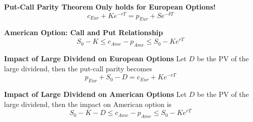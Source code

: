 \documentclass[11pt,fleqn]{book} %
\numberwithin{equation}{section} %
\numberwithin{figure}{section} %
\numberwithin{table}{section} %
\begin{document}
 \begin{theorem}\textbf{Put-Call Parity Theorem}
 \textbf{Only holds for European Options!}
 $$
 c_{Eur}+Ke^{-rT}=p_{Eur}+Se^{-\delta T}
 $$
 \end{theorem}
 \begin{theorem}\textbf{American Option: Call and Put Relationship}
 $$
 S_0-K\leq c_{Ame}-p_{Ame}\leq S_0-Ke^{rT}
 $$
 \end{theorem}
 \begin{theorem}\textbf{Impact of Large Dividend on European Options}
 Let $D$ be the PV of the large dividend, then the put-call parity becomes
 $$
 p_{Eur}+S_0-D=c_{Eur}+Ke^{-rT}
 $$
 \end{theorem}
 \begin{theorem}\textbf{Impact of Large Dividend on American Options}
 Let $D$ be the PV of the large dividend, then the impact on American option is
 $$
 S_0-K-D\leq c_{Ame}-p_{Ame}\leq S_0-Ke^{rT}
 $$
 \end{theorem}
\end{document}
